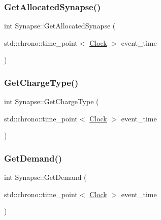 \subsubsection{\texorpdfstring{Get\+Allocated\+Synapse()}{GetAllocatedSynapse()}}
{\footnotesize\ttfamily int Synapse\+::\+Get\+Allocated\+Synapse (\begin{DoxyParamCaption}\item[{std\+::chrono\+::time\+\_\+point$<$ \mbox{\hyperlink{universe_8h_a0ef8d951d1ca5ab3cfaf7ab4c7a6fd80}{Clock}} $>$}]{event\+\_\+time }\end{DoxyParamCaption})}

\mbox{\label{classSynapse_a1390c9fed5c01e712797818af1305ec0}} 
\subsubsection{\texorpdfstring{Get\+Charge\+Type()}{GetChargeType()}}
{\footnotesize\ttfamily int Synapse\+::\+Get\+Charge\+Type (\begin{DoxyParamCaption}\item[{std\+::chrono\+::time\+\_\+point$<$ \mbox{\hyperlink{universe_8h_a0ef8d951d1ca5ab3cfaf7ab4c7a6fd80}{Clock}} $>$}]{event\+\_\+time }\end{DoxyParamCaption})\hspace{0.3cm}{\ttfamily [inline]}}

\mbox{\label{classSynapse_a6d4d63e445961c62f71eaf0da1c2848b}} 
\subsubsection{\texorpdfstring{Get\+Demand()}{GetDemand()}}
{\footnotesize\ttfamily int Synapse\+::\+Get\+Demand (\begin{DoxyParamCaption}\item[{std\+::chrono\+::time\+\_\+point$<$ \mbox{\hyperlink{universe_8h_a0ef8d951d1ca5ab3cfaf7ab4c7a6fd80}{Clock}} $>$}]{event\+\_\+time }\end{DoxyParamCaption})}

\mbox{\label{classSynapse_a314047a6f724abee8c73a16c68f3a8c2}} 
